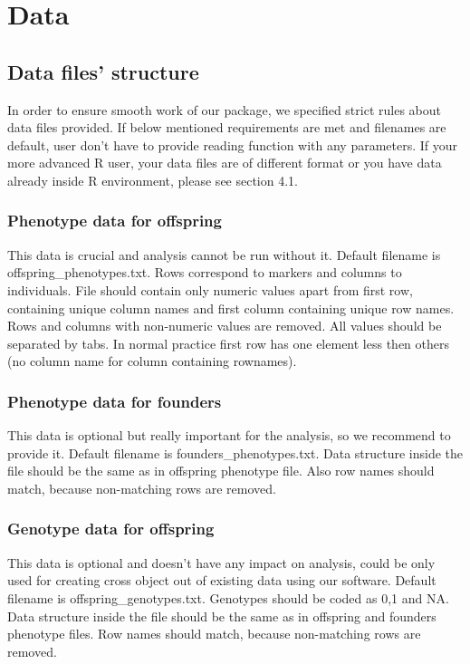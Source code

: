 \documentclass{article}
\begin{document}
\newpage
\section{Data}

\subsection{Data files' structure}
{\noindent}In order to ensure smooth work of our package, we specified strict rules about data files provided. If below mentioned requirements are met and filenames are default, user don't have to provide reading function with any parameters. If your more advanced R user, your data files are of different format or you have data already inside R environment, please see section 4.1. 
\subsubsection{Phenotype data for offspring}
This data is crucial and analysis cannot be run without it. Default filename is offspring\_phenotypes.txt. Rows correspond to markers and columns to individuals. File should contain only numeric values apart from first row, containing unique column names and first column containing unique row names. Rows and columns with non-numeric values are removed. All values should be separated by tabs. In normal practice first row has one element less then others (no column name for column containing rownames).
\subsubsection{Phenotype data for founders}
This data is optional but really important for the analysis, so we recommend to provide it. Default filename is founders\_phenotypes.txt. Data structure inside the file should be the same as in offspring phenotype file. Also row names should match, because non-matching rows are removed.
\subsubsection{Genotype data for offspring}
This data is optional and doesn't have any impact on analysis, could be only used for creating cross object out of existing data using our software. Default filename is offspring\_genotypes.txt. Genotypes should be coded as 0,1 and NA. Data structure inside the file should be the same as in offspring and founders phenotype files. Row names should match, because non-matching rows are removed. 
\end{document}
